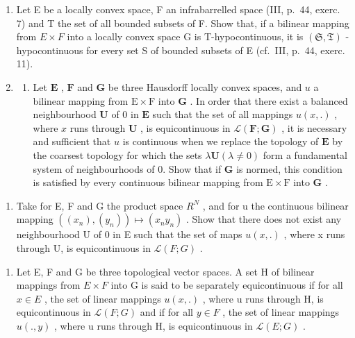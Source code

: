 \begin{enumerate}
\def\labelenumi{\arabic{enumi})}
\setcounter{enumi}{3}
\item
  Let E be a locally convex space, F an infrabarrelled space (III, p.~44, exerc. 7) and T the set of all bounded subsets of F. Show that, if a bilinear mapping from \(E \times F\) into a locally convex space G is T-hypocontinuous, it is \((\mathfrak{S}, \mathfrak{T})\) -hypocontinuous for every set S of bounded subsets of E (cf.~III, p.~44, exerc. 11).
\item
  \begin{enumerate}
  \def\labelenumii{\alph{enumii})}
  \tightlist
  \item
    Let \(\mathbf{E}\) , \(\mathbf{F}\) and \(\mathbf{G}\) be three Hausdorff locally convex spaces, and \(u\) a bilinear mapping from \(\mathrm{E} \times \mathrm{F}\) into \(\mathbf{G}\) . In order that there exist a balanced neighbourhood \(\mathbf{U}\) of 0 in \(\mathbf{E}\) such that the set of all mappings \(u(x, .)\) , where \(x\) runs through \(\mathbf{U}\) , is equicontinuous in \(\mathcal{L}(\mathbf{F}; \mathbf{G})\) , it is necessary and sufficient that \(u\) is continuous when we replace the topology of \(\mathbf{E}\) by the coarsest topology for which the sets \(\lambda \mathbf{U} (\lambda \neq 0)\) form a fundamental system of neighbourhoods of 0. Show that if \(\mathbf{G}\) is normed, this condition is satisfied by every continuous bilinear mapping from \(\mathrm{E} \times \mathrm{F}\) into \(\mathbf{G}\) .
  \end{enumerate}
\end{enumerate}

\begin{enumerate}
\def\labelenumi{\alph{enumi})}
\setcounter{enumi}{1}
\tightlist
\item
  Take for E, F and G the product space \(R^{N}\) , and for u the continuous bilinear mapping \(((x_{n}), (y_{n})) \mapsto (x_{n}y_{n})\) . Show that there does not exist any neighbourhood U of 0 in E such that the set of maps \(u(x, .)\) , where x runs through U, is equicontinuous in \(\mathcal{L}(F; G)\) .
\end{enumerate}

\begin{enumerate}
\def\labelenumi{\arabic{enumi})}
\setcounter{enumi}{5}
\tightlist
\item
  Let E, F and G be three topological vector spaces. A set H of bilinear mappings from \(E \times F\) into G is said to be separately equicontinuous if for all \(x \in E\) , the set of linear mappings \(u(x, .)\) , where u runs through H, is equicontinuous in \(\mathcal{L}(F; G)\) and if for all \(y \in F\) , the set of linear mappings \(u(. , y)\) , where u runs through H, is equicontinuous in \(\mathcal{L}(E; G)\) .
\end{enumerate}


